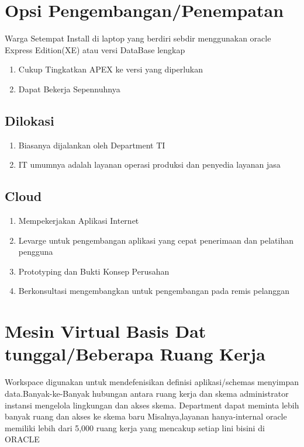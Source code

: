 \documentclass{article}
\begin{document}
\begin{enumerate}
 \section{Opsi Pengembangan/Penempatan}
  Warga Setempat Install di laptop yang berdiri sebdir menggunakan oracle Express Edition(XE) atau versi DataBase lengkap
      \begin{enumerate}
          \item Cukup Tingkatkan APEX ke versi yang diperlukan
          \item Dapat Bekerja Sepennuhnya
      \end{enumerate}
\subsection{Dilokasi}
      \begin{enumerate}
          \item Biasanya dijalankan oleh Department TI
          \item IT umumnya adalah layanan operasi produksi dan penyedia layanan jasa
      \end{enumerate}
\subsection{Cloud}
      \begin{enumerate}
          \item Mempekerjakan Aplikasi Internet
          \item Levarge untuk pengembangan aplikasi yang cepat penerimaan dan pelatihan pengguna
          \item Prototyping dan Bukti Konsep Perusahan
          \item Berkonsultasi mengembangkan untuk pengembangan pada remis pelanggan
      \end{enumerate}
\section{Mesin Virtual Basis Dat tunggal/Beberapa Ruang Kerja}
Workspace digunakan untuk mendefenisikan definisi aplikasi/schemas menyimpan data.Banyak-ke-Banyak hubungan antara ruang kerja dan skema administrator instansi mengelola lingkungan dan akses skema. Department dapat meminta lebih banyak ruang dan akses ke skema baru Misalnya,layanan hanya-internal oracle memiliki lebih dari 5,000 ruang kerja yang mencakup setiap lini bisini di ORACLE  
      \end{enumerate}
\end{document}
